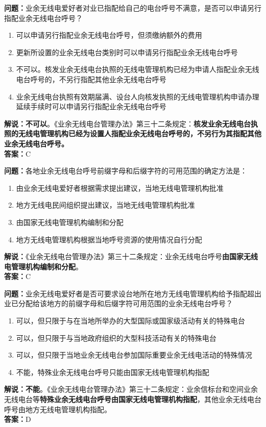 \documentclass{ctexbook}
\begin{document}
\noindent\textbf{问题：}业余无线电爱好者对业已指配给自己的电台呼号不满意，是否可以申请另行指配业余无线电台呼号？
\begin{enumerate}[label=\Alph*), leftmargin=3em]
	\item 可以申请另行指配业余无线电台呼号，但须缴纳额外的费用
	\item 更新所设置的业余无线电台类别时可以申请另行指配业余无线电台呼号
	\item 不可以。核发业余无线电台执照的无线电管理机构已经为申请人指配业余无线电台呼号的，不另行指配其他业余无线电台呼号
	\item 业余无线电台执照有效期届满、设台人向核发执照的无线电管理机构申请办理延续手续时可以申请另行指配业余无线电台呼号
\end{enumerate}
\textbf{解说：不可以}。《业余无线电台管理办法》第三十二条规定：\textbf{核发业余无线电台执照的无线电管理机构已经为设置人指配业余无线电台呼号的，不另行为其指配其他业余无线电台呼号。}\\\noindent\textbf{答案：}C


\bigskip


\noindent\textbf{问题：}各地业余无线电台呼号前缀字母和后缀字符的可用范围的确定方法是：
\begin{enumerate}[label=\Alph*), leftmargin=3em]
	\item 由业余无线电爱好者根据需求提出建议，当地无线电管理机构批准
	\item 地方无线电民间组织提出建议，当地无线电管理机构批准
	\item 由国家无线电管理机构编制和分配
	\item 地方无线电管理机构根据当地呼号资源的使用情况自行分配
\end{enumerate}
\noindent\textbf{解说：}《业余无线电台管理办法》第三十二条规定：业余无线电台呼号\textbf{由国家无线电管理机构编制和分配}。\\\noindent\textbf{答案：}C


\bigskip


\noindent\textbf{问题：}业余无线电爱好者是否可要求设台地所在地方无线电管理机构给予指配超出业已分配给该地方的前缀字母和后缀字符可用范围的业余无线电台呼号？
\begin{enumerate}[label=\Alph*), leftmargin=3em]
	\item 可以，但只限于与在当地所举办的大型国际或国家级活动有关的特殊电台
	\item 可以，但只限于与当地政府组织的大型科技活动有关的特殊电台
	\item 可以，但只限于当地业余无线电台参加国际重要业余无线电活动的特殊情况
	\item 不能，特殊业余无线电台呼号只能由国家无线电管理机构指配
\end{enumerate}
\textbf{解说：不能}。《业余无线电台管理办法》第三十二条规定：业余信标台和空间业余无线电台等\textbf{特殊业余无线电台呼号由国家无线电管理机构指配}，其他业余无线电台呼号由地方无线电管理机构指配。\\\noindent\textbf{答案：}D
\end{document}
